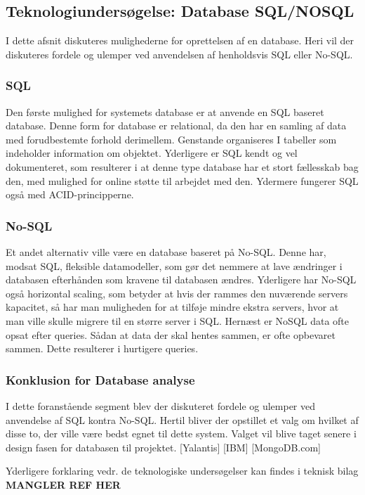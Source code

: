 \subsection{Teknologiundersøgelse: Database SQL/NOSQL
}
I dette afsnit diskuteres mulighederne for oprettelsen af en database. Heri vil der diskuteres fordele og ulemper ved anvendelsen af henholdsvis SQL eller No-SQL.

\subsubsection{SQL}
Den første mulighed for systemets database er at anvende en SQL baseret database. Denne form for database
er relational, da den har en samling af data med forudbestemte forhold derimellem. Genstande
organiseres I tabeller som indeholder information om objektet. Yderligere er SQL kendt og vel
dokumenteret, som resulterer i at denne type database har et stort fællesskab bag den, med mulighed for online støtte til arbejdet med den. Ydermere fungerer SQL også med ACID-principperne.

\subsubsection{No-SQL}
Et andet alternativ ville være en database baseret på No-SQL. Denne har, modsat SQL, fleksible
datamodeller, som gør det nemmere at lave ændringer i databasen efterhånden som kravene til
databasen ændres. Yderligere har No-SQL også horizontal scaling, som betyder at hvis der rammes
den nuværende servers kapacitet, så har man muligheden for at tilføje mindre ekstra servers, hvor at man ville skulle migrere til en større server i SQL. Hernæst er NoSQL data ofte opsat efter queries. Sådan at data der skal hentes sammen,
er ofte opbevaret sammen. Dette resulterer i hurtigere queries.

\subsubsection{Konklusion for Database analyse}
I dette foranstående segment blev der diskuteret fordele og ulemper ved anvendelse af SQL kontra
No-SQL. Hertil bliver der opstillet et valg om hvilket af disse to, der ville være bedst egnet til dette
system. Valget vil blive taget senere i design fasen for databasen til projektet.
[Yalantis] [IBM] [MongoDB.com]

Yderligere forklaring vedr. de teknologiske undersøgelser kan findes i teknisk bilag \textbf{MANGLER REF HER}
